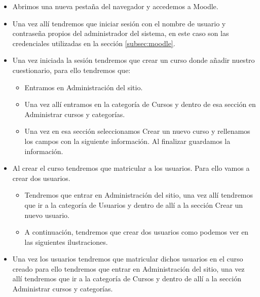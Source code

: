 \begin{itemize}

	\item Abrimos una nueva pestaña del navegador y accedemos a Moodle.
	
	\item Una vez allí tendremos que iniciar sesión con el nombre de usuario y contraseña propios del administrador del sistema, en este caso son las credenciales utilizadas en la sección \ref{subsec:moodle}. 
	
	\item Una vez iniciada la sesión tendremos que crear un curso donde añadir nuestro cuestionario, para ello tendremos que:
	
	\begin{itemize}
	
		\item Entramos en Administración del sitio.
		
		\item Una vez allí entramos en la categoría de Cursos y dentro de esa sección en Administrar cursos y categorías. 
		
		\item Una vez en esa sección seleccionamos Crear un nuevo curso y rellenamos los campos con la siguiente información. Al finalizar guardamos la información.
	\end{itemize}
	
	\item Al crear el curso tendremos que matricular a los usuarios. Para ello vamos a crear dos usuarios.
	
	\begin{itemize}
		
		\item Tendremos que entrar en Administración del sitio, una vez allí tendremos que ir a la categoría de Usuarios y dentro de allí a la sección Crear un nuevo usuario. 
		
		\item A continuación, tendremos que crear dos usuarios como podemos ver en las siguientes ilustraciones.  
	\end{itemize}
	
	\item Una vez los usuarios tendremos que matricular dichos usuarios en el curso creado para ello tendremos que entrar en Administración del sitio, una vez allí tendremos que ir a la categoría de Cursos y dentro de allí a la sección Administrar cursos y categorías.
	

\end{itemize}
